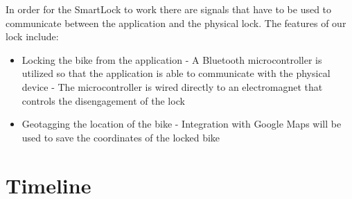 \documentclass[12pt, titlepage]{article}
\begin{document}
In order for the SmartLock to work there are signals that have to be used to communicate between the application and the physical lock. 
The features of our lock include: 
\begin{itemize}
\item Locking the bike from the application
\subitem - A Bluetooth microcontroller is utilized so that the application is able to communicate with the physical device
\subitem - The microcontroller is wired directly to an electromagnet that controls the disengagement of the lock
\item Geotagging the location of the bike
\subitem - Integration with Google Maps will be used to save the coordinates of the locked bike
\end{itemize}

\section{Timeline}
\end{document}

